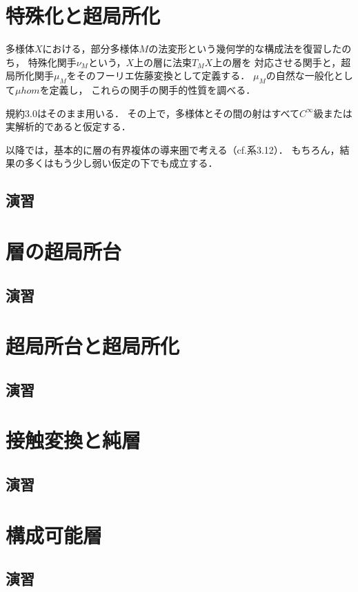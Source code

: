 \chapter{特殊化と超局所化}\label{chap4}
多様体\(X\)における，部分多様体\(M\)の法変形という幾何学的な構成法を復習したのち，
特殊化関手\(\nu_M\)という，\(X\)上の層に法束\(T_MX\)上の層を
対応させる関手と，超局所化関手\(\mu_M\)をそのフーリエ佐藤変換として定義する．
\(\mu_M\)の自然な一般化として\(\mu hom\)を定義し，
これらの関手の関手的性質を調べる．
\setcounter{CNV}{-1}
\begin{CNV}\label{cnv40}
    規約3.0はそのまま用いる．
    その上で，多様体とその間の射はすべて\(C^{\infty}\)級または実解析的であると仮定する．

    以降では，基本的に層の有界複体の導来圏で考える（cf.系3.12）．
    もちろん，結果の多くはもう少し弱い仮定の下でも成立する．
\end{CNV}
\section*{演習}
\chapter{層の超局所台}\label{chap5}
\section*{演習}
\chapter{超局所台と超局所化}\label{chap6}
\section*{演習}
\chapter{接触変換と純層}\label{chap7}
\section*{演習}
\chapter{構成可能層}\label{chap8}
\section*{演習}
